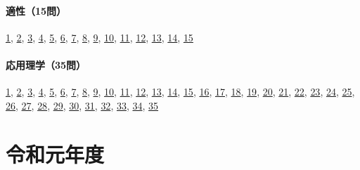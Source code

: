 \paragraph{適性（15問）} \hyperref[q:h30-reg-apt-01]{1}, \hyperref[q:h30-reg-apt-02]{2}, \hyperref[q:h30-reg-apt-03]{3}, \hyperref[q:h30-reg-apt-04]{4}, \hyperref[q:h30-reg-apt-05]{5}, \hyperref[q:h30-reg-apt-06]{6}, \hyperref[q:h30-reg-apt-07]{7}, \hyperref[q:h30-reg-apt-08]{8}, \hyperref[q:h30-reg-apt-09]{9}, \hyperref[q:h30-reg-apt-10]{10}, \hyperref[q:h30-reg-apt-11]{11}, \hyperref[q:h30-reg-apt-12]{12}, \hyperref[q:h30-reg-apt-13]{13}, \hyperref[q:h30-reg-apt-14]{14}, \hyperref[q:h30-reg-apt-15]{15}
\paragraph{応用理学（35問）} \hyperref[q:h30-reg-applied-01]{1}, \hyperref[q:h30-reg-applied-02]{2}, \hyperref[q:h30-reg-applied-03]{3}, \hyperref[q:h30-reg-applied-04]{4}, \hyperref[q:h30-reg-applied-05]{5}, \hyperref[q:h30-reg-applied-06]{6}, \hyperref[q:h30-reg-applied-07]{7}, \hyperref[q:h30-reg-applied-08]{8}, \hyperref[q:h30-reg-applied-09]{9}, \hyperref[q:h30-reg-applied-10]{10}, \hyperref[q:h30-reg-applied-11]{11}, \hyperref[q:h30-reg-applied-12]{12}, \hyperref[q:h30-reg-applied-13]{13}, \hyperref[q:h30-reg-applied-14]{14}, \hyperref[q:h30-reg-applied-15]{15}, \hyperref[q:h30-reg-applied-16]{16}, \hyperref[q:h30-reg-applied-17]{17}, \hyperref[q:h30-reg-applied-18]{18}, \hyperref[q:h30-reg-applied-19]{19}, \hyperref[q:h30-reg-applied-20]{20}, \hyperref[q:h30-reg-applied-21]{21}, \hyperref[q:h30-reg-applied-22]{22}, \hyperref[q:h30-reg-applied-23]{23}, \hyperref[q:h30-reg-applied-24]{24}, \hyperref[q:h30-reg-applied-25]{25}, \hyperref[q:h30-reg-applied-26]{26}, \hyperref[q:h30-reg-applied-27]{27}, \hyperref[q:h30-reg-applied-28]{28}, \hyperref[q:h30-reg-applied-29]{29}, \hyperref[q:h30-reg-applied-30]{30}, \hyperref[q:h30-reg-applied-31]{31}, \hyperref[q:h30-reg-applied-32]{32}, \hyperref[q:h30-reg-applied-33]{33}, \hyperref[q:h30-reg-applied-34]{34}, \hyperref[q:h30-reg-applied-35]{35}
\section{令和元年度}

